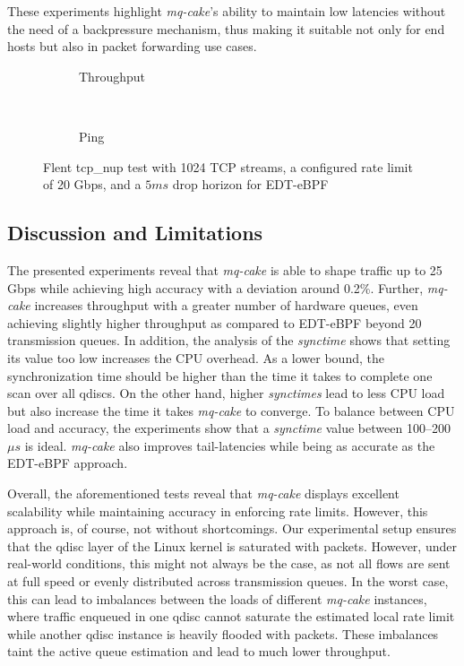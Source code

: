 These experiments highlight \textit{mq-cake}'s ability to maintain low latencies without the need of a backpressure mechanism, thus making it suitable not only for end hosts but also in packet forwarding use cases. 
\begin{figure}
    \centering
    \hspace{-0.25cm}
    \begin{subfigure}{\linewidth}
        \centering
        
        \caption{Throughput}\label{fig:flent_tp_5ms}
    \end{subfigure}
    \\
    \begin{subfigure}{\linewidth}
        \centering
        
        \caption{Ping}\label{fig:flent_ping_5ms}
    \end{subfigure}
    \caption{Flent tcp\_nup test with 1024 TCP streams, a configured rate limit of 20 Gbps, and a $5ms$ drop horizon for EDT-eBPF}\label{fig:flent_5ms}
\end{figure}

\subsection{Discussion and Limitations}
The presented experiments reveal that \textit{mq-cake} is able to shape traffic up to 25 Gbps while achieving high accuracy with a deviation around 0.2\%.
%
Further, \textit{mq-cake} increases throughput with a greater number of hardware queues, even achieving slightly higher throughput as compared to EDT-eBPF beyond 20 transmission queues.
%
In addition, the analysis of the \textit{synctime} shows that setting its value too low increases the CPU overhead.
%
As a lower bound, the synchronization time should be higher than the time it takes to complete one scan over all qdiscs.
%
On the other hand, higher \textit{synctimes} lead to less CPU load but also increase the time it takes \textit{mq-cake} to converge.
%
To balance between CPU load and accuracy, the experiments show that a \textit{synctime} value between 100--200$\mu s$ is ideal.
\textit{mq-cake} also improves tail-latencies while being as accurate as the EDT-eBPF approach.

Overall, the aforementioned tests reveal that \textit{mq-cake} displays excellent scalability while maintaining accuracy in enforcing rate limits.
%
However, this approach is, of course, not without shortcomings.
%
Our experimental setup ensures that the qdisc layer of the Linux kernel is saturated with packets.
%
However, under real-world conditions, this might not always be the case, as not all flows are sent at full speed or evenly distributed across transmission queues.
%
In the worst case, this can lead to imbalances between the loads of different \textit{mq-cake} instances, where traffic enqueued in one qdisc cannot saturate the estimated local rate limit while another qdisc instance is heavily flooded with packets.
%
These imbalances taint the active queue estimation and lead to much lower throughput.
%


